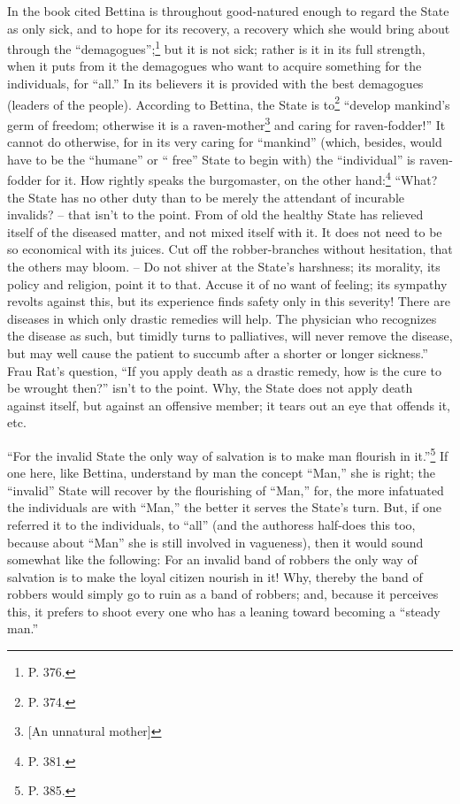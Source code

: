 In the book cited Bettina is throughout good-natured enough to regard the 
State as only sick, and to hope for its recovery, a recovery which she would 
bring about through the ``demagogues'';\footnote{P. 376.} but it is not 
sick; rather is it in its full strength, when it puts from it the demagogues 
who want to acquire something for the individuals, for ``all.'' In its 
believers it is provided with the best demagogues (leaders of the people). 
According to Bettina, the State is to\footnote{P. 374.} ``develop mankind's 
germ of freedom; otherwise it is a raven-mother\footnote{[An unnatural 
mother]} and caring for raven-fodder!'' It cannot do otherwise, for in its 
very caring for ``mankind'' (which, besides, would have to be the 
``humane'' or `` free'' State to begin with) the ``individual'' is 
raven-fodder for it. How rightly speaks the burgomaster, on the other 
hand:\footnote{P. 381.} ``What? the State has no other duty than to be merely 
the attendant of incurable invalids? -- that isn't to the point. From of old 
the healthy State has relieved itself of the diseased matter, and not mixed 
itself with it. It does not need to be so economical with its juices. Cut off 
the robber-branches without hesitation, that the others may bloom. -- Do not 
shiver at the State's harshness; its morality, its policy and religion, point 
it to that. Accuse it of no want of feeling; its sympathy revolts against 
this, but its experience finds safety only in this severity! There are 
diseases in which only drastic remedies will help. The physician who 
recognizes the disease as such, but timidly turns to palliatives, will never 
remove the disease, but may well cause the patient to succumb after a shorter 
or longer sickness.'' Frau Rat's question, ``If you apply death as a drastic 
remedy, how is the cure to be wrought then?'' isn't to the point. Why, the 
State does not apply death against itself, but against an offensive member; it 
tears out an eye that offends it, etc.

``For the invalid State the only way of salvation is to make man flourish in 
it.''\footnote{P. 385.} If one here, like Bettina, understand by man the 
concept ``Man,'' she is right; the ``invalid'' State will recover by the 
flourishing of ``Man,'' for, the more infatuated the individuals are with 
``Man,'' the better it serves the State's turn. But, if one referred it to 
the individuals, to ``all'' (and the authoress half-does this too, because 
about ``Man'' she is still involved in vagueness), then it would sound 
somewhat like the following: For an invalid band of robbers the only way of 
salvation is to make the loyal citizen nourish in it! Why, thereby the band of 
robbers would simply go to ruin as a band of robbers; and, because it 
perceives this, it prefers to shoot every one who has a leaning toward 
becoming a ``steady man.''

